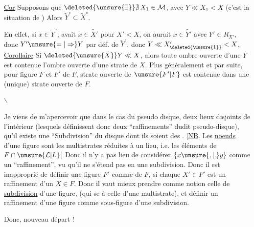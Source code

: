 \uline{Cor}  Supposons que $\deleted{\unsure{\exists}}\nexists\,X_1\in\mathcal M$, avec $Y\ll X_1<X$ (c'est la situation de ) Alors $\widetilde Y^\circ\subset\widetilde X^\circ$.

En effet, si $x\in\widetilde Y^\circ$,  avait $x\in\widetilde{X'}$ pour $X'<X$, on aurait $x\in\widetilde{Y'}$ avec $Y'\in R_{X'}$, donc $Y'\unsure{=|\Rightarrow}Y$ par déf. de $\widetilde Y^\circ$, donc $Y\ll X'_{\deleted{\unsure{1}}}<X$, 
\uline{Corollaire} Si $\deleted{\unsure{X}}Y\ll X$, alors  toute ombre ouverte d'une   $Y$ est contenue  l'ombre ouverte d'une strate de $X$. Plus généralement et par suite, pour  figure $F$ et    $F'$ de $F$,    strate ouverte de $\unsure{F'|F}$ est contenue dans une (unique) strate ouverte de $F$.

\enspace$\backslash$

Je viens de m'apercevoir que dans le cas du pseudo disque,  deux lieux disjoints   de l'intérieur (lesquels définissent donc deux ``raffinements'' dudit pseudo-disque), qu'il existe une ``Subdivision'' du disque dont ils soient des . [\uline{NB}. Les \uline{noeuds} d'une figure  sont les multistrates  réduites à un lieu, i.e. les éléments de $F\cap\unsure{\mathcal L|L}$] Donc  il n'y a pas lieu de considérer $\{x\unsure{,|.}y\}$ comme un ``raffinement'', vu qu'il ne s'étend pas en une subdivision. Donc il est inapproprié
de définir une figure $F'$ comme  \uline{} de $F$, si chaque $X'\in F'$  est un raffinement d'un $X\in F$. Donc il vaut mieux prendre comme notion  celle de \uline{subdivision} d'une  figure, (qui  se  à celle d'une multistrate), et définir un raffinement d'une figure comme sous-figure d'une subdivision.

Donc, nouveau départ !

